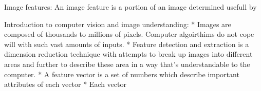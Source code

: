 Image features:  An image feature is a portion of an image determined usefull by 


Introduction to computer vision and image understanding:
    * Images are composed of thousands to millions of pixels.  Computer algoirthims do not cope will with such vast amounts of inputs.
    * Feature detection and extraction is a dimension reduction technique with attempts to break up images into different areas and further to describe these area in a way that's understandable to the computer.
    * A feature vector is a set of numbers which describe important attributes of each vector
    * Each vector 
    
